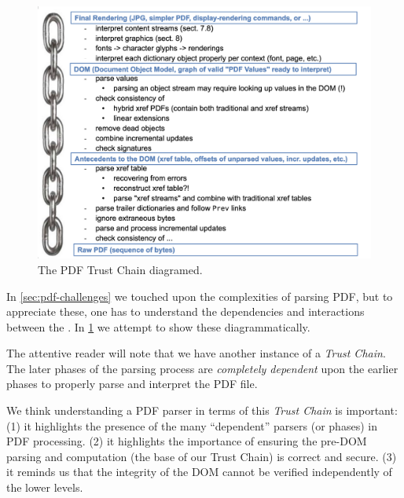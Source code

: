 \begin{figure}[t]
    \centering
    \includegraphics[width=\linewidth]{figures/trustchain-diagram.png}
    \caption{The PDF Trust Chain diagramed.}
    \label{fig:pdf-trust-chain}
\end{figure}

In \cref{sec:pdf-challenges} we touched upon the complexities of parsing
PDF, but to appreciate these, one has to understand the
dependencies and interactions between the .
In \cref{fig:pdf-trust-chain} we attempt to show these diagrammatically.


The attentive reader will note that we have another instance of a \emph{Trust
Chain}.  The later phases of the parsing process are \emph{completely
dependent} upon the earlier phases to properly parse and interpret the PDF
file.


We think understanding a PDF parser in terms of this \emph{Trust Chain} is
important:
%
(1) it highlights the presence of the many ``dependent'' parsers (or phases)
in PDF processing.
%
(2) it highlights the importance of ensuring the pre-DOM parsing and
computation (the base of our Trust Chain) is correct and secure.
%
(3) it reminds us that the integrity of the DOM cannot be verified
independently of the lower levels.

